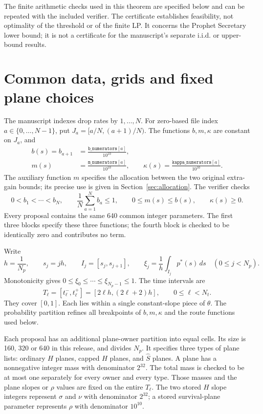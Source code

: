 \documentclass[11pt,a4paper]{article}
\begin{document}
The finite arithmetic checks used in this theorem are specified below and can
be repeated with the included verifier. The certificate establishes feasibility,
not optimality of the threshold or of the finite LP. It concerns the Prophet
Secretary lower bound; it is not a certificate for the manuscript's separate
i.i.d. or upper-bound results.

\section{Common data, grids and fixed plane choices}\label{sec:data}
The manuscript indexes drop rates by $1,\ldots,N$. For zero-based file index
$a\in\{0,\ldots,N-1\}$, put $J_a=[a/N,(a+1)/N)$.
The functions $b,m,\kappa$ are constant on $J_a$, and
\[
 \begin{aligned}
 b(s)=b_{a+1}&=\frac{\texttt{b\_numerators}[a]}{10^{10}},\\
 m(s)&=\frac{\texttt{m\_numerators}[a]}{10^{10}},\qquad
 \kappa(s)=\frac{\texttt{kappa\_numerators}[a]}{10^{10}}.
 \end{aligned}
\]
The auxiliary function $m$ specifies the allocation between the two original
extra-gain bounds; its precise use is given in Section~\ref{sec:allocation}.
The verifier checks
\[
 0<b_1<\cdots<b_N,\qquad
 \frac1N\sum_{a=1}^N b_a\le1,\qquad
 0\le m(s)\le b(s),\qquad \kappa(s)\ge0.
\]
Every proposal contains the same 640 common integer parameters. The first
three blocks specify these three functions; the fourth block is checked to
be identically zero and contributes no term.

Write
\[
 h=\frac1{N_p},\qquad s_j=jh,\qquad I_j=[s_j,s_{j+1}],\qquad
 \xi_j=\frac1h\int_{I_j}p^*(s)\,ds\quad(0\le j<N_p).
\]
Monotonicity gives $0\le\xi_0\le\cdots\le\xi_{N_p-1}\le1$.
The time intervals are
\[
 T_\ell=[t_\ell^-,t_\ell^+]
       =[2\ell h,(2\ell+2)h],\qquad 0\le\ell<N_t.
\]
They cover $[0,1]$. Each lies within a single constant-slope piece of
$\theta$. The probability partition refines all breakpoints of $b,m,\kappa$
and the route functions used below.

Each proposal has an additional plane-owner partition into equal cells.
Its size is 160, 320 or 640 in this release, and divides $N_p$.
It specifies three types of plane lists: ordinary $H$ planes, capped $H$
planes, and $\widehat S$ planes. A plane has a nonnegative integer mass with
denominator $2^{32}$. The total mass is checked to be at most one separately
for every owner and every type. Those masses and the plane slopes or $\rho$
values are fixed on the entire $T_\ell$.
The two stored $H$ slope integers represent $\sigma$ and $\nu$ with
denominator $2^{32}$; a stored survival-plane parameter represents
$\rho$ with denominator $10^{10}$.
\end{document}
